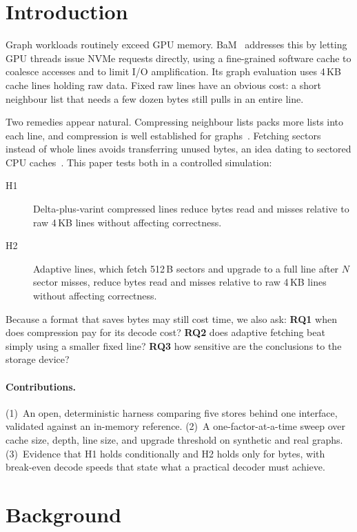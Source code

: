 \documentclass[sigconf,nonacm]{acmart}
\begin{document}
\section{Introduction}
Graph workloads routinely exceed GPU memory. BaM~\cite{bam} addresses this by letting GPU threads
issue NVMe requests directly, using a fine-grained software cache to coalesce accesses and to limit
I/O amplification. Its graph evaluation uses 4\,KB cache lines holding raw data. Fixed raw lines have an obvious cost: a
short neighbour list that needs a few dozen bytes still pulls in an entire line.

Two remedies appear natural. Compressing neighbour lists packs more lists into each line, and compression is well
established for graphs~\cite{webgraph,ligraplus}. Fetching sectors instead of whole lines avoids
transferring unused bytes, an idea dating to sectored CPU caches~\cite{liptay}. This paper tests both in a controlled simulation:

\begin{description}
\item[H1] Delta-plus-varint compressed lines reduce bytes read and misses relative to raw 4\,KB lines without affecting correctness.
\item[H2] Adaptive lines, which fetch 512\,B sectors and upgrade to a full line after $N$ sector misses, reduce bytes read and misses
relative to raw 4\,KB lines without affecting correctness.
\end{description}

\noindent Because a format that saves bytes may still cost time, we also ask:
\textbf{RQ1} when does compression pay for its decode cost?
\textbf{RQ2} does adaptive fetching beat simply using a smaller fixed line?
\textbf{RQ3} how sensitive are the conclusions to the storage device?

\paragraph{Contributions.}
(1)~An open, deterministic harness comparing five stores behind one interface, validated against an in-memory reference.
(2)~A one-factor-at-a-time sweep over cache size, depth, line size, and upgrade threshold on synthetic and real graphs.
(3)~Evidence that H1 holds conditionally and H2 holds only for bytes, with break-even decode speeds that state what
a practical decoder must achieve.

\section{Background}
\end{document}
